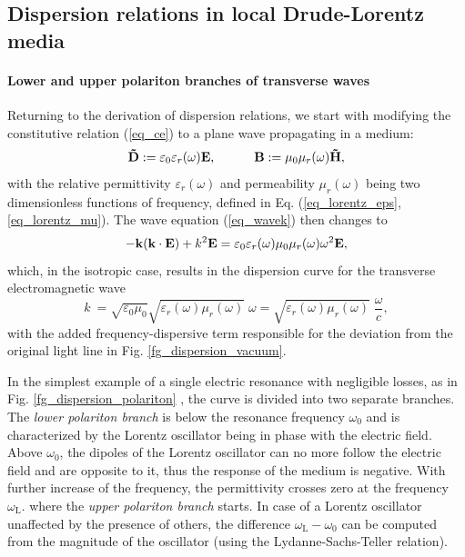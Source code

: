 \subsection{Dispersion relations in local Drude-Lorentz media} \label{disp_rel_local_media}
\paragraph{Lower and upper polariton branches of transverse waves}  %
Returning to the derivation of dispersion relations, we start with modifying the constitutive relation (\ref{eq_ce}) to a plane wave propagating in a medium:
\begin{equation}		\mathbf{\tilde{D}} := \varepsilon_0\varepsilon_r(\omega)	\mathbf{E}, \quad\quad\quad						\mathbf{B} := \mu_0\mu_r(\omega)		\mathbf{\tilde{H}},				 \label{eq_ce2}\end{equation}
with the relative permittivity $\varepsilon_r(\omega)$ and permeability $\mu_r(\omega)$ being two dimensionless functions of frequency, defined in Eq. (\ref{eq_lorentz_eps}, \ref{eq_lorentz_mu}). 
The wave equation (\ref{eq_wavek}) then changes to
\begin{equation} - {\mathbf{k}} ({\mathbf{k}} \cdot \mathbf{E}) + k^2 \mathbf{E} = \varepsilon_0 \varepsilon_r(\omega) \mu_0 \mu_r(\omega) \omega^{2} \mathbf{E}, \label{eq_wavek_disp} \end{equation}
which, in the isotropic case, results in the dispersion curve for the transverse electromagnetic wave 
\begin{equation} k~= \sqrt{\varepsilon_0 \mu_0} \sqrt{\varepsilon_{r}(\omega) \mu_{r}(\omega)}\;\omega = \sqrt{\varepsilon_{r}(\omega) \mu_{r}(\omega)}\; \frac{\omega}{c}, \label{eq_dispeq_vac}\end{equation}
with the added frequency-dispersive term responsible for the deviation from the original light line in Fig. \ref{fg_dispersion_vacuum}. 

In the simplest example of a single electric resonance with negligible losses, as in Fig. \ref{fg_dispersion_polariton} %
, the curve is divided into two separate branches. The \textit{lower polariton branch} is below the resonance frequency $\omega_0$ and is characterized by the Lorentz oscillator being in phase with the electric field.
Above $\omega_0$, the dipoles of the Lorentz oscillator can no more follow the electric field and are opposite to it, thus the response of the medium is negative. With further increase of the frequency, the permittivity crosses zero at the frequency $\omega_{\text{L}}$. %
where the \textit{upper polariton branch} starts. In case of a Lorentz oscillator unaffected by the presence of others, the difference $\omega_{\text{L}} - \omega_0$ can be computed from the magnitude of the oscillator (using the Lydanne-Sachs-Teller relation).\cite{klingshirn2007semiconductor}

